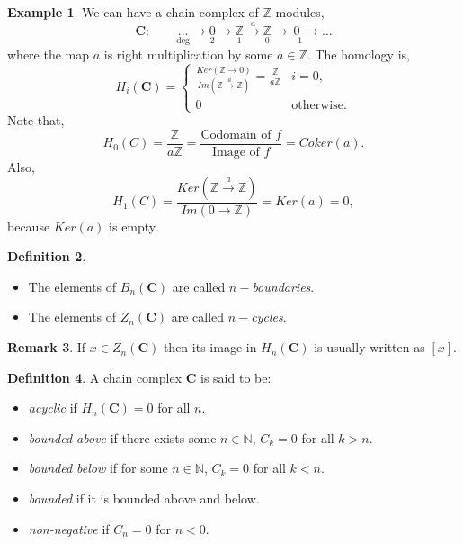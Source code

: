\documentclass[11.5pt, twoside, a4paper, titlepage]{report}
\providecommand{\equ}[0]{\begin{equation*}}
\providecommand{\eequ}[0] {\end{equation*}}
\providecommand{\bb}[1]{\mathbb{#1}}
\theoremstyle{definition}
\newtheorem{mydef}{Definition}[section]
\newtheorem{rem}[mydef]{Remark}
\newtheorem{eg}[mydef]{Example}
\theoremstyle{plain}
\begin{document}
\begin{eg} \label{chainZeg}
We can have a chain complex of $\mathbb{Z}$-modules,
\equ
\mathbf{C}: \qquad \underset{\text{deg}}{\dots} \xrightarrow{}\underset{2}{0} \xrightarrow{} \underset{1}{\mathbb{Z}} \xrightarrow{a}\underset{0}{\mathbb{Z}} \xrightarrow{} \underset{-1}{0} \xrightarrow{}\dots 
\eequ
where the map $a$ is right multiplication by some $a \in \mathbb{Z}$. The homology is,
\equ
H_i(\mathbf{C}) = 
\begin{cases}
\frac{Ker(\mathbb{Z}\xrightarrow{} 0)}{Im(\mathbb{Z}\xrightarrow{a}\mathbb{Z})}=\frac{\mathbb{Z}}{a\mathbb{Z}} & i=0,\\
0 & \text{otherwise}.
\end{cases}
\eequ
Note that,
\equ
H_0(C)=\frac{\bb{Z}}{a\bb{Z}}= \frac{\text{Codomain of }f}{\text{Image of }f}=Coker(a).
\eequ
Also,
\equ
H_1(C)=\frac{Ker(\bb{Z}\xrightarrow{a}\bb{Z})}{Im(0\xrightarrow{}\bb{Z})}=Ker(a)=0,
\eequ
because $Ker(a)$ is empty.
\end{eg}

\begin{mydef}
\begin{itemize}
\item The elements of $B_n(\mathbf{C})$ are called \emph{$n-$boundaries}.
\item The elements of $Z_n(\mathbf{C})$ are called \emph{$n-$cycles}.
\end{itemize}
\end{mydef}

\begin{rem} %
If $x\in Z_n(\mathbf{C})$ then its image in $H_n(\mathbf{C})$ is usually written as $[x]$.
\end{rem}

\begin{mydef}
A chain complex $\mathbf{C}$ is said to be:
\begin{itemize}
\item \emph{acyclic} if $H_n(\mathbf{C})=0$ for all $n$.
\item \emph{bounded above} if there exists some $n\in \mathbb{N}$, $C_k=0$ for all $k>n$.
\item \emph{bounded below} if for some $n \in \mathbb{N}$, $C_k=0$ for all $k<n$.
\item \emph{bounded} if it is bounded above and below.
\item \emph{non-negative}  if $C_n=0$ for $n<0$.
\end{itemize}
\end{mydef}
\end{document}
